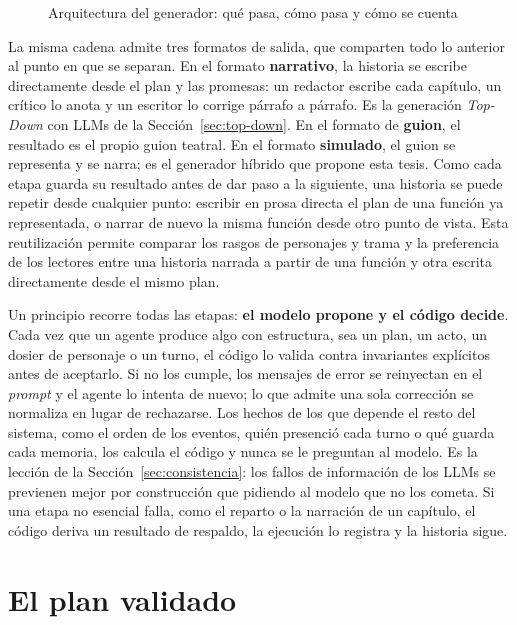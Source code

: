 \begin{figure}[t]
  \centering
  
  \caption{Arquitectura del generador: qué pasa, cómo pasa y cómo se cuenta}
  \label{fig:arquitectura}
\end{figure}

La misma cadena admite tres formatos de salida, que comparten todo lo anterior al punto en que se
separan. En el formato \textbf{narrativo}, la historia se escribe directamente desde el plan y las
promesas: un redactor escribe cada capítulo, un crítico lo anota y un escritor lo corrige párrafo a
párrafo. Es la generación \textit{Top-Down} con LLMs de la Sección~\ref{sec:top-down}. En el formato
de \textbf{guion}, el resultado es el propio guion teatral. En el formato \textbf{simulado}, el
guion se representa y se narra; es el generador híbrido que propone esta tesis. Como cada etapa
guarda su resultado antes de dar paso a la siguiente, una historia se puede repetir desde cualquier
punto: escribir en prosa directa el plan de una función ya representada, o narrar de nuevo la misma
función desde otro punto de vista. Esta reutilización permite comparar los rasgos de personajes y trama y la preferencia de los lectores
entre una historia narrada a partir de una función y otra escrita directamente desde el mismo plan.

Un principio recorre todas las etapas: \textbf{el modelo propone y el código decide}. Cada vez que
un agente produce algo con estructura, sea un plan, un acto, un dosier de personaje o un turno, el
código lo valida contra invariantes explícitos antes de aceptarlo. Si no los cumple, los mensajes de
error se reinyectan en el \textit{prompt} y el agente lo intenta de nuevo; lo que admite una sola
corrección se normaliza en lugar de rechazarse. Los hechos de los que depende el resto del sistema,
como el orden de los eventos, quién presenció cada turno o qué guarda cada memoria, los calcula el
código y nunca se le preguntan al modelo. Es la lección de la Sección~\ref{sec:consistencia}: los
fallos de información de los LLMs se previenen mejor por construcción que pidiendo al modelo que no
los cometa. Si una etapa no esencial falla, como el reparto o la narración de un capítulo, el código
deriva un resultado de respaldo, la ejecución lo registra y la historia sigue.

\section{El plan validado}\label{sec:plan}

